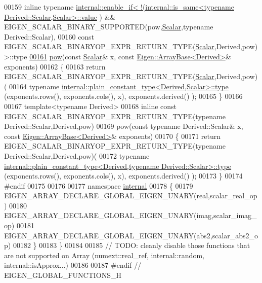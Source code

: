 \begin{DoxyCode}
00159   \textcolor{keyword}{inline} \textcolor{keyword}{typename} 
      \hyperlink{struct_eigen_1_1internal_1_1enable__if}{internal::enable\_if<   !(internal::is\_same<typename Derived::Scalar,Scalar>::value}
      ) && EIGEN\_SCALAR\_BINARY\_SUPPORTED(pow,\hyperlink{group___core___module_a5feed465b3a8e60c47e73ecce83e39a2}{Scalar},\textcolor{keyword}{typename} Derived::Scalar),
00160           \textcolor{keyword}{const} EIGEN\_SCALAR\_BINARYOP\_EXPR\_RETURN\_TYPE(\hyperlink{group___core___module_a5feed465b3a8e60c47e73ecce83e39a2}{Scalar},Derived,pow) >::type
\hyperlink{group___core___module_a7db6f1ad242a31a2fa421f500d1258c5}{00161}   \hyperlink{group___core___module_a7db6f1ad242a31a2fa421f500d1258c5}{pow}(\textcolor{keyword}{const} \hyperlink{group___core___module_a5feed465b3a8e60c47e73ecce83e39a2}{Scalar}& x, \textcolor{keyword}{const} \hyperlink{group___core___module_class_eigen_1_1_array_base}{Eigen::ArrayBase<Derived>}& exponents)
00162   \{
00163     \textcolor{keywordflow}{return} EIGEN\_SCALAR\_BINARYOP\_EXPR\_RETURN\_TYPE(\hyperlink{group___core___module_a5feed465b3a8e60c47e73ecce83e39a2}{Scalar},Derived,pow)(
00164             \textcolor{keyword}{typename} \hyperlink{group___core___module_class_eigen_1_1_cwise_nullary_op}{internal::plain\_constant\_type<Derived,Scalar>::type}
      (exponents.rows(), exponents.cols(), x), exponents.derived() );
00165   \}
00166 
00167   \textcolor{keyword}{template}<\textcolor{keyword}{typename} Derived>
00168   \textcolor{keyword}{inline} \textcolor{keyword}{const} EIGEN\_SCALAR\_BINARYOP\_EXPR\_RETURN\_TYPE(\textcolor{keyword}{typename} Derived::Scalar,Derived,pow)
00169   pow(\textcolor{keyword}{const} \textcolor{keyword}{typename} Derived::Scalar& x, \textcolor{keyword}{const} \hyperlink{group___core___module_class_eigen_1_1_array_base}{Eigen::ArrayBase<Derived>}& 
      exponents)
00170   \{
00171     \textcolor{keywordflow}{return} EIGEN\_SCALAR\_BINARYOP\_EXPR\_RETURN\_TYPE(\textcolor{keyword}{typename} Derived::Scalar,Derived,pow)(
00172       \textcolor{keyword}{typename} 
      \hyperlink{group___core___module_class_eigen_1_1_cwise_nullary_op}{internal::plain\_constant\_type<Derived,typename Derived::Scalar>::type}
      (exponents.rows(), exponents.cols(), x), exponents.derived() );
00173   \}
00174 \textcolor{preprocessor}{#endif}
00175 
00176 
00177   \textcolor{keyword}{namespace }\hyperlink{namespaceinternal}{internal}
00178   \{
00179     EIGEN\_ARRAY\_DECLARE\_GLOBAL\_EIGEN\_UNARY(real,scalar\_real\_op)
00180     EIGEN\_ARRAY\_DECLARE\_GLOBAL\_EIGEN\_UNARY(imag,scalar\_imag\_op)
00181     EIGEN\_ARRAY\_DECLARE\_GLOBAL\_EIGEN\_UNARY(abs2,scalar\_abs2\_op)
00182   \}
00183 \}
00184 
00185 \textcolor{comment}{// TODO: cleanly disable those functions that are not supported on Array (numext::real\_ref,
       internal::random, internal::isApprox...)}
00186 
00187 \textcolor{preprocessor}{#endif // EIGEN\_GLOBAL\_FUNCTIONS\_H}
\end{DoxyCode}
